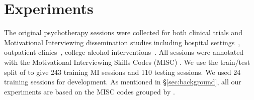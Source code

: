 \section{Experiments}
\label{sec:snt:experiments}

 The original psychotherapy sessions were collected for both clinical trials and Motivational Interviewing dissemination studies including hospital
settings~\cite{roy2014brief}, outpatient
clinics~\cite{baer2009agency}, college alcohol
interventions~\cite{tollison2008questions, neighbors2012randomized,
  lee2013indicated, lee2014randomized}.  All sessions were annotated with the Motivational Interviewing Skills Codes (MISC) \cite{atkins2014scaling}.    We use the train/test split
of \citet{can2015dialog, tanana2016comparison} to give 243 training MI
sessions and 110 testing sessions. We used 24 training sessions for
development.
As mentioned in \S\ref{sec:background}, all our experiments are
based on the MISC codes grouped by \citet{xiao2016behavioral}.







